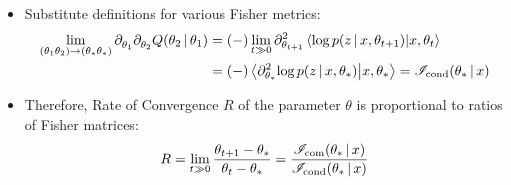 \begin{frame} [t] 
\begin{itemize}
    \item Substitute definitions for 
        various Fisher metrics:
        { \footnotesize
        \begin{align*}
          \lim _{ ( \theta _{1} 
                    \theta _{2} 
                  )
                  \rightarrow
                  ( \theta _{*} 
                    \theta _{*} 
                  )
                } 
          \del {} {\theta _{1}} {}
          \del { Q \conditional 
                   {\theta _{2}} 
                   {\theta _{1}}
               } {\theta _{2}} {} 
        & = 
          (-) \lim _{t \gg 0}
        \del 
         {} {\theta _{t + 1}} {2}
         \braket 
          {
            \varlog p 
            \conditional 
               {z} {x, \theta _{t+1}}
          }
          {x, \theta _{t}}
        \\ & =
         (-) 
         \braket 
          { \del {} {\theta _{*}} {2}
            \varlog p 
            \conditional 
               {z} {x, \theta _{*}}
          }
          {x, \theta _{*}}
        = 
         \fisher _{\text{cond}}
         \conditional 
           {\theta _{*}} {x}
        \end{align*} 
        } 
    \item Therefore, 
    Rate of Convergence  $R$
    of the parameter $\theta$
    is proportional to 
    ratios of Fisher matrices:
        { \footnotesize
        \begin{align*}
         R
        =
         \lim _{t \gg 0}
         \frac 
         {\theta _{t+1} - \theta _{*}}
         {\theta _{t} - \theta _{*}}
        =  
         \frac 
             { \fisher _{\text {com}}
                \conditional 
                 {\theta _{*}} {x}
             } 
             { \fisher _{\text {cond}}
                \conditional 
                 {\theta _{*}} {x}
             }
        \end{align*}
        }
\end{itemize}    
\end{frame}


